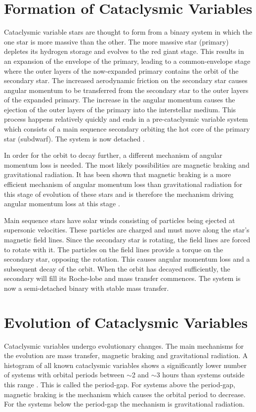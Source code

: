 \section{Formation of Cataclysmic Variables}


Cataclysmic variable stars are thought to form from a binary system in which the one star is more massive than the other. The more massive star (primary) depletes its hydrogen storage and evolves to the red giant stage. This results in an expansion of the envelope of the primary, leading to a common-envelope stage where the outer layers of the now-expanded primary contains the orbit of the secondary star. The increased aerodynamic friction on the secondary star causes angular momentum to be transferred from the secondary star to the outer layers of the expanded primary. The increase in the angular momentum causes the ejection of the outer layers of the primary into the interstellar medium. This process happens relatively quickly and ends in a pre-cataclysmic variable system which consists of a main sequence secondary orbiting the hot core of the primary star (subdwarf). The system is now detached \citep{warnerbible}.

In order for the orbit to decay further, a different mechanism of angular momentum loss is needed. The most likely possibilities are magnetic braking and gravitational radiation. It has been shown that magnetic braking is a more efficient mechanism of angular momentum loss than gravitational radiation for this stage of evolution of these stars and is therefore the mechanism driving angular momentum loss at this stage \citep{magbrake}.

Main sequence stars have solar winds consisting of particles being ejected at supersonic velocities. These particles are charged and must move along the star's magnetic field lines. Since the secondary star is rotating, the field lines are forced to rotate with it. The particles on the field lines provide a torque on the secondary star, opposing the rotation. This causes angular momentum loss and a subsequent decay of the orbit. When the orbit has decayed sufficiently, the secondary will fill its Roche-lobe and mass transfer commences. The system is now a semi-detached binary with stable mass transfer.


\section{Evolution of Cataclysmic Variables}

Cataclysmic variables undergo evolutionary changes. The main mechanisms for the evolution are mass transfer, magnetic braking and gravitational radiation. A histogram of all known cataclysmic variables shows a significantly lower number of systems with orbital periods between $\sim$2 and $\sim$3 hours than systems outside this range \citep{baraffekolb}. This is called the period-gap. For systems above the period-gap, magnetic braking is the mechanism which causes the orbital period to decrease. For the systems below the period-gap the mechanism is gravitational radiation.

